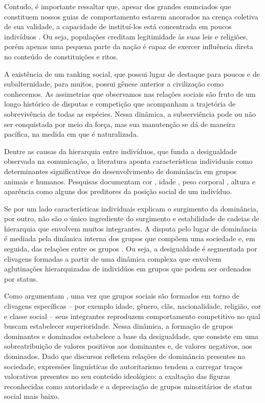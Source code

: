 \documentclass[
12pt,				%
openright,			%
twoside,			%
a4paper,			%
english,			%
french,				%
spanish,			%
brazil				%
]{abntex2}
\begin{document}
Contudo, é importante ressaltar que, apesar dos grandes enunciados que constituem nossos guias de comportamento estarem ancorados na crença coletiva de sua validade, a capacidade de instituí-los está concentrada em poucos indivíduos \cite{foucault1969archeologie}. Ou seja, populações creditam legitimidade às suas leis e religiões, porém apenas uma pequena parte da nação é capaz de exercer influência direta no conteúdo de constituições e ritos.

A existência de um ranking social, que possui lugar de destaque para poucos e de subalternidade, para muitos, possui gênese anterior a civilização como conhecemos. As assimetrias que observamos nas relações sociais são fruto de um longo histórico de disputas e competição que acompanham a trajetória de sobrevivência de todas as espécies. Nessa dinâmica, a subserviência pode ou não ser conquistada por meio da força, mas sua manutenção se dá de maneira pacífica, na medida em que é naturalizada. 

Dentre as causas da hierarquia entre indivíduos, que funda a desigualdade observada na comunicação, a literatura aponta características individuais como determinantes significativos do desenvolvimento de dominância em grupos animais e humanos. Pesquisas documentam cor \cite{bakker1983determinants}, idade \cite{cote2000dominance, bohlin2001determinants}, peso corporal \cite{morgan2000predictors}, altura \cite{huang2002camera} e aparência \cite{lawson2010looking, lodge2013rationalizing} como alguns dos preditores da posição social de um indivíduo.    

Se por um lado características individuais explicam o surgimento da dominância, por outro, não são o único ingrediente do surgimento e estabilidade de cadeias de hierarquia que envolvem muitos integrantes. A disputa pelo lugar de dominância é mediada pela dinâmica interna dos grupos que compõem uma sociedade \cite{ridgeway1989dominance} e, em seguida, das relações entre os grupos \cite{chase1980social,chase2002individual}. Ou seja, a desigualdade é segmentada por clivagens formadas a partir de uma dinâmica complexa que envolvem aglutinações hierarquizadas de individúos em grupos que podem ser ordenados por status.  

Como argumentam , uma vez que grupos sociais são formados em torno de clivagens específicas -- por exemplo idade, gênero, clãs, nacionalidade, religião, cor e classe social -- seus integrantes reproduzem comportamento competitivo no qual buscam estabelecer superioridade. Nessa dinâmica, a formação de grupos dominantes e dominados estabelece a base da desigualdade, que consiste em uma sobreatribuição de valores positivos aos dominantes e, de valores negativos, aos dominados. Dado que discursos refletem relações de dominância presentes na sociedade, expressões linguísticas do autoritarismo tendem a carregar traços valorativos presentes no seu conteúdo ideológico: a exaltação das figuras reconhecidas como autoridade e a depreciação de grupos minoritários de status social mais baixo. 
\end{document}
